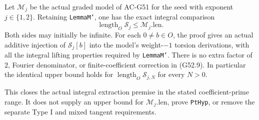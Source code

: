 \begin{theorem}
\label{AC-G52}
Let $\mathcal M_j$ be the actual graded model of AC-G51
for the seed with exponent $j\in\{1,2\}$.
Retaining \texttt{LemmaM'}, one has the exact integral
comparison
\[
                  \operatorname{length}_O\mathcal S_j
                        \le \mathcal M_j.\mathrm{len}.       \tag{G52.9}
\]
Both sides may initially be infinite.  For each
$0\ne b\in O$, the proof gives an actual additive
injection of $\mathcal S_j[b]$ into the model's
weight-$-1$ torsion derivations, with all the integral
lifting properties required by \texttt{LemmaM'}.
There is no extra factor of $2$, Fourier denominator,
or finite-coefficient correction in (G52.9).
In particular the identical upper bound holds for
$\operatorname{length}_O\mathcal S_{j,N}$ for every $N>0$.

This closes the actual integral extraction premise in
the stated coefficient-prime range.  It does not supply
an upper bound for $\mathcal M_j.\mathrm{len}$, prove
\texttt{PtHyp}, or remove the separate Type I and mixed
tangent requirements.
\end{theorem}
